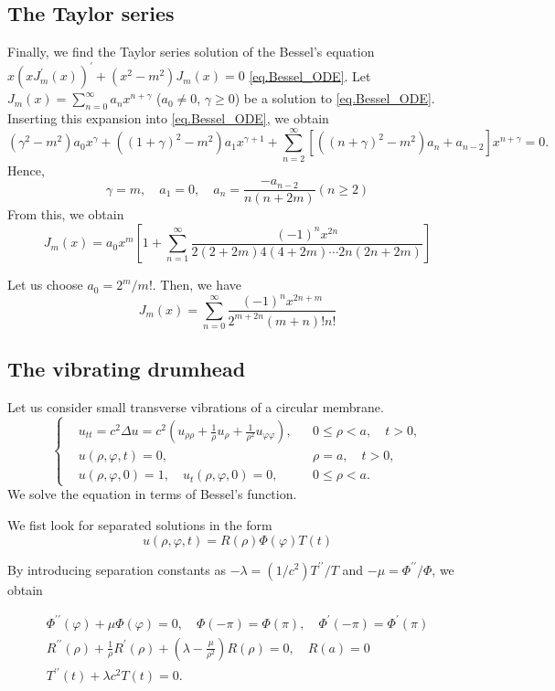 \subsection{The Taylor series}

Finally, we find the Taylor series solution of the Bessel's equation $x(x J_m^{\prime}(x))^{\prime} + (x^2 - m^2) J_m(x) = 0$ \eqref{eq.Bessel_ODE}. Let $J_m(x)=\sum_{n=0}^{\infty} a_n x^{n+\gamma}$ ($a_0 \neq 0$, $\gamma \geq 0$) be a solution to \eqref{eq.Bessel_ODE}. Inserting this expansion into \eqref{eq.Bessel_ODE}, we obtain
$$
\left(\gamma^2-m^2\right) a_0 x^\gamma+\left((1+\gamma)^2-m^2\right) a_1 x^{\gamma+1}+\sum_{n=2}^{\infty}\left[\left((n+\gamma)^2-m^2\right) a_n+a_{n-2}\right] x^{n+\gamma}=0 .
$$
Hence,
$$
\gamma=m, \quad a_1=0, \quad a_n=\frac{-a_{n-2}}{n(n+2 m)}(n \geq 2)
$$
From this, we obtain
$$
J_m(x)=a_0 x^m\left[1+\sum_{n=1}^{\infty} \frac{(-1)^n x^{2 n}}{2(2+2 m) 4(4+2 m) \cdots 2 n(2 n+2 m)}\right]
$$

Let us choose $a_0=2^m / m!$. Then, we have
$$
J_m(x)=\sum_{n=0}^{\infty} \frac{(-1)^n x^{2 n+m}}{2^{m+2 n}(m+n)!n!}
$$


\subsection{The vibrating drumhead}

Let us consider small transverse vibrations of a circular membrane.
$$
\left\{\begin{aligned}
&u_{tt}=c^2 \Delta u=c^2\left(u_{\rho \rho}+\frac{1}{\rho} u_\rho+\frac{1}{\rho^2} u_{\varphi \varphi}\right), && 0 \leq \rho<a, \quad t>0, 
\\
&u(\rho, \varphi, t)=0, && \rho=a, \quad t>0, 
\\
&u(\rho, \varphi, 0)=1, \quad u_t(\rho, \varphi, 0)=0, && 0 \leq \rho<a .
\end{aligned}\right.
$$
We solve the equation in terms of Bessel's function.

We fist look for separated solutions in the form
$$
u(\rho, \varphi, t)=R(\rho) \Phi(\varphi) T(t)
$$


By introducing separation constants as $-\lambda=\left(1 / c^2\right) T^{\prime \prime} / T$ and $-\mu=\Phi^{\prime \prime} / \Phi$, we obtain

$$
\begin{array}{r}
\Phi^{\prime \prime}(\varphi)+\mu \Phi(\varphi)=0, \quad \Phi(-\pi)=\Phi(\pi), \quad \Phi^{\prime}(-\pi)=\Phi^{\prime}(\pi) \\
R^{\prime \prime}(\rho)+\frac{1}{\rho} R^{\prime}(\rho)+\left(\lambda-\frac{\mu}{\rho^2}\right) R(\rho)=0, \quad R(a)=0 \\
T^{\prime \prime}(t)+\lambda c^2 T(t)=0 .
\end{array}
$$


